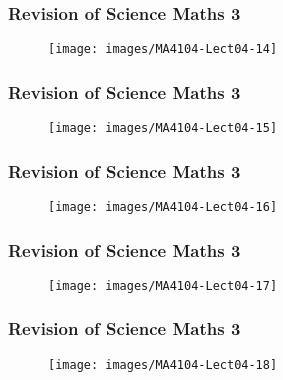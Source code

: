 \documentclass{beamer}
\begin{document}
	\begin{frame}
		\frametitle{Revision of Science Maths 3}
		\begin{figure}
			\centering
			\texttt{[image: images/MA4104-Lect04-14]}
			
		\end{figure}
	\end{frame}
	\begin{frame}
		\frametitle{Revision of Science Maths 3}
		\begin{figure}
			\centering
			\texttt{[image: images/MA4104-Lect04-15]}
			
		\end{figure}
	\end{frame}
	\begin{frame}
		\frametitle{Revision of Science Maths 3}
		\begin{figure}
			\centering
			\texttt{[image: images/MA4104-Lect04-16]}
			
		\end{figure}
	\end{frame}
	\begin{frame}
		\frametitle{Revision of Science Maths 3}
		\begin{figure}
			\centering	
			\texttt{[image: images/MA4104-Lect04-17]}
			
		\end{figure}
	\end{frame}
	\begin{frame}
		\frametitle{Revision of Science Maths 3}
		\begin{figure}
			\centering
			\texttt{[image: images/MA4104-Lect04-18]}
			
		\end{figure}
	\end{frame}
	
	
\end{document}

